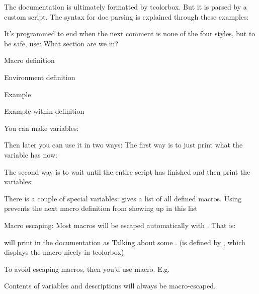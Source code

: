 The documentation is ultimately formatted by tcolorbox. But it is parsed by a custom script.
The syntax for doc parsing is explained through these examples:

It's programmed to end when the next comment is none of the four styles, but to be safe, use:
What section are we in?


Macro definition

Environment definition

Example

Example within definition

You can make variables:

Then later you can use it in two ways:
The first way is to just print what the variable has now:

The second way is to wait until the entire script has finished and then
print the variables:

There is a couple of special variables:
gives a list of all defined macros. Using
prevents the next macro definition from showing up in this list

Macro escaping:
Most macros will be escaped automatically with \dac. That is:

will print in the documentation as Talking about some .
(\dac is defined by \let\dac\DocumentAuxCommand, which displays the macro nicely in tcolorbox)

To avoid escaping macros, then you'd use \!macro. E.g.

Contents of variables and descriptions will always be macro-escaped.
